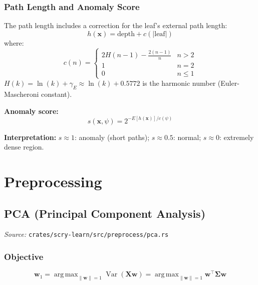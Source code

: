 \documentclass[11pt,a4paper]{article}
\theoremstyle{definition}
\theoremstyle{remark}
\DeclareMathOperator*{\argmax}{arg\,max}
\DeclareMathOperator{\Var}{Var}
\begin{document}
\subsubsection*{Path Length and Anomaly Score}

The path length includes a correction for the leaf's external path length:
\begin{equation}
h(\mathbf{x}) = \text{depth} + c(|\text{leaf}|)
\end{equation}
where:
\begin{equation}
c(n) = \begin{cases} 2H(n-1) - \frac{2(n-1)}{n} & n > 2 \\ 1 & n = 2 \\ 0 & n \leq 1 \end{cases}
\end{equation}
$H(k) = \ln(k) + \gamma_E \approx \ln(k) + 0.5772$ is the harmonic number (Euler-Mascheroni constant).

\textbf{Anomaly score:}
\begin{equation}
s(\mathbf{x}, \psi) = 2^{-E[h(\mathbf{x})]/c(\psi)}
\end{equation}

\textbf{Interpretation:} $s \approx 1$: anomaly (short paths); $s \approx 0.5$: normal; $s \approx 0$: extremely dense region.


\section{Preprocessing}

\subsection{PCA (Principal Component Analysis)}
\label{sec:pca}

\noindent\textit{Source:} \texttt{crates/scry-learn/src/preprocess/pca.rs}

\subsubsection*{Objective}
\begin{equation}
\mathbf{w}_1 = \argmax_{\|\mathbf{w}\|=1} \Var(\mathbf{X}\mathbf{w}) = \argmax_{\|\mathbf{w}\|=1} \mathbf{w}^\top\boldsymbol{\Sigma}\mathbf{w}
\end{equation}
\end{document}
